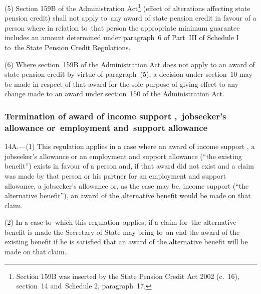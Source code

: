 \documentclass[12pt,a4paper]{article}
\begin{document}
(5) Section 159B of the Administration Act\footnote{Section 159B was inserted by the State Pension Credit Act 2002 (c.\ 16), section~14 and~Schedule 2, paragraph~17.} (effect of alterations affecting state pension credit) shall not apply to~any award of state pension credit in favour of a person where in relation to~that person the appropriate minimum guarantee includes an amount determined under paragraph~6 of Part~III of Schedule I to~the State Pension Credit Regulations.

(6) Where section~159B of the Administration Act does not apply to an award of state pension credit by virtue of paragraph~(5), a decision under section~10 may be made in respect of that award for the sole purpose of giving effect to any change made to an award under section~150 of the Administration Act.


\subsubsection[14A. Termination of award of income support%
,~jobseeker’s allowance or~employment and~support allowance%
]{Termination of award of income support%
,~jobseeker’s allowance or~employment and~support allowance%
}

14A.---(1)  This regulation applies in a case where an award of income support%
, a jobseeker’s allowance or an employment and support allowance  %
(“the existing benefit”) exists in favour of a person and, if that award did not exist and a claim was made by that person or his partner for 
an employment and support allowance,  %
a jobseeker’s allowance or, as the case may be, income support (“the alternative benefit”), an award of the alternative benefit would be made on that claim.

(2) In a case to~which this regulation~applies, if a claim for~the alternative benefit is made the Secretary of State may bring to~an end the award of the existing benefit if he is satisfied that an award of the alternative benefit will be made on that claim.
\end{document}
